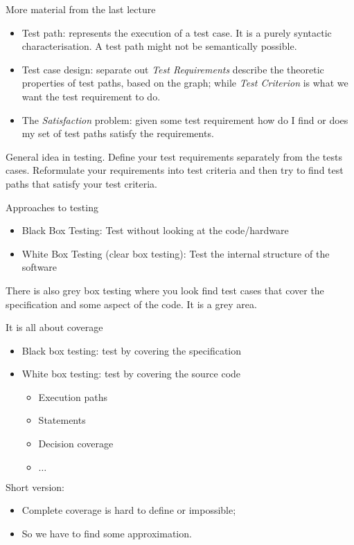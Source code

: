 \documentclass[handout]{beamer}
\begin{document}
 \begin{frame}{More material from the last lecture}
  \begin{itemize}
  \item Test path: represents the execution of a test case. It is a purely
    syntactic characterisation.  A test path might not be semantically
    possible.
    \item Test case design: separate out {\em Test Requirements} describe the
      theoretic properties of test paths, based on the graph; while {\em Test Criterion} is what we want
      the test requirement to do.
    \item The {\em Satisfaction} problem: given some test requirement how do I
      find or does my set of test paths satisfy the requirements. 
    \end{itemize}
    General idea in testing. Define your test requirements separately from the
    tests cases. Reformulate your requirements into test criteria and then try
    to find test paths that satisfy your test criteria.
\end{frame}


\begin{frame}{Approaches to testing}
  \begin{itemize}
  \item Black Box Testing: Test without looking at the code/hardware
  \item White Box Testing (clear box testing):  Test the internal
    structure of the software
  \end{itemize}
  There is also grey box testing where you look find test cases that cover the
  specification and some aspect of the code.  It is a grey area.  
\end{frame}
\begin{frame}{It is all about coverage}
  \begin{itemize}
  \item Black box testing: test by covering the specification
  \item White box testing: test by covering the source code
    \begin{itemize}
    \item Execution paths
    \item Statements
    \item Decision coverage
    \item $\ldots$
    \end{itemize}
  \end{itemize}
  Short version:
  \begin{itemize}
  \item  Complete coverage is hard to define or impossible;
  \item  So we have to find some approximation.
  \end{itemize}
\end{frame}
\end{document}
